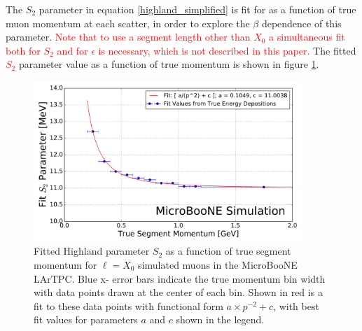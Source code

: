 \documentclass[a4paper,11pt]{article}
\begin{document}
The $S_2$ parameter in equation \ref{highland_simplified} is fit for as a function of true muon momentum at each scatter, in order to explore the $\beta$ dependence of this parameter. \textcolor{red}{Note that to use a segment length other than $X_0$ a simultaneous fit both for $S_2$ and for $\epsilon$ is necessary, which is not described in this paper.} The fitted \textcolor{red}{$S_2$} parameter value as a function of true momentum is shown in figure \ref{retune_highland_fig1}.



\begin{figure}[ht!]
\begin{center}
\includegraphics[width=0.9\textwidth]{Figures/highland_constant_optimization_momentumdependent.png}
\end{center}
\caption{Fitted Highland parameter $S_2$ as a function of true segment momentum for ${\ell} = X_0$ simulated muons in the MicroBooNE LArTPC. Blue x- error bars indicate the true momentum bin width with data points drawn at the center of each bin. Shown in red is a fit to these data points with functional form $a\times p^{-2} + c$, with best fit values for parameters $a$ and $c$ shown in the legend.}
\label{retune_highland_fig1}
\end{figure}
\end{document}
